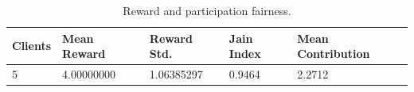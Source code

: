 \begin{table}[t]
\centering
\caption{Reward and participation fairness.}
\label{tab:fairness}
\begin{tabular}{lllll}
\hline
Clients & Mean Reward & Reward Std. & Jain Index & Mean Contribution \\
\hline
5 & 4.00000000 & 1.06385297 & 0.9464 & 2.2712 \\
\hline
\end{tabular}
\end{table}
